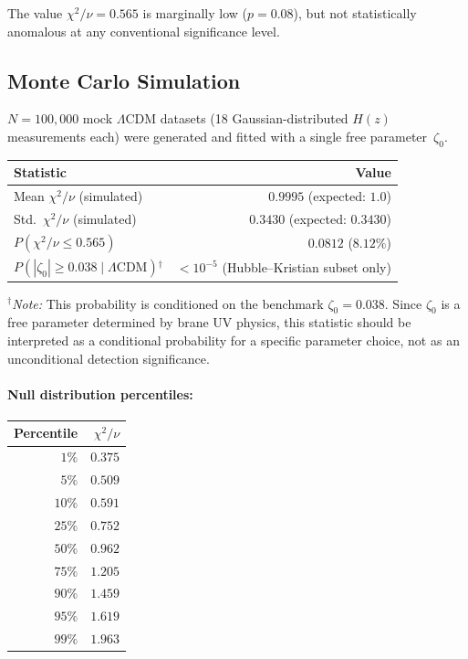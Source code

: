 \noindent
The value $\chi^2/\nu = 0.565$ is marginally low ($p = 0.08$), but not statistically anomalous at any conventional significance level.

\subsection{Monte Carlo Simulation}

$N = 100{,}000$ mock $\Lambda$CDM datasets (18 Gaussian-distributed $H(z)$ measurements each) were generated and fitted with a single free parameter~$\zeta_0$.

\begin{center}
\begin{tabular}{l r}
\hline
Statistic & Value \\
\hline
Mean $\chi^2/\nu$ (simulated) & $0.9995$ (expected: $1.0$) \\
Std.\ $\chi^2/\nu$ (simulated) & $0.3430$ (expected: $0.3430$) \\
$P(\chi^2/\nu \leq 0.565)$ & $0.0812$ ($8.12\%$) \\
$P(|\zeta_0| \geq 0.038 \mid \Lambda\mathrm{CDM})$${}^{\dagger}$ & $< 10^{-5}$ (Hubble--Kristian subset only) \\
\hline
\end{tabular}
\end{center}

\noindent
${}^{\dagger}$\textit{Note:} This probability is conditioned on the benchmark $\zeta_0 = 0.038$. Since $\zeta_0$ is a free parameter determined by brane UV physics, this statistic should be interpreted as a conditional probability for a specific parameter choice, not as an unconditional detection significance.

\paragraph{Null distribution percentiles:}
\begin{center}
\begin{tabular}{r r}
\hline
Percentile & $\chi^2/\nu$ \\
\hline
$1\%$ & $0.375$ \\
$5\%$ & $0.509$ \\
$10\%$ & $0.591$ \\
$25\%$ & $0.752$ \\
$50\%$ & $0.962$ \\
$75\%$ & $1.205$ \\
$90\%$ & $1.459$ \\
$95\%$ & $1.619$ \\
$99\%$ & $1.963$ \\
\hline
\end{tabular}
\end{center}

